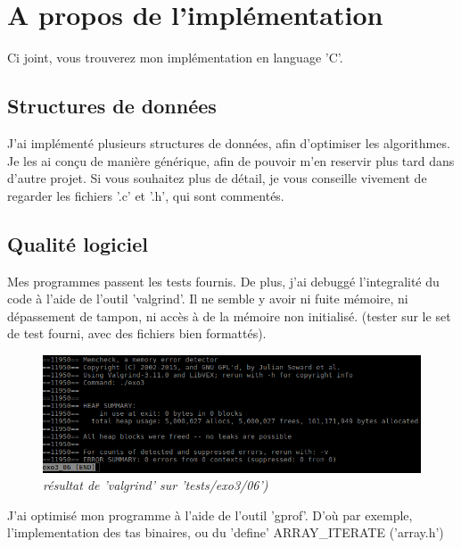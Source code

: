 \documentclass[10pt]{article}
\begin{document}
	\newpage
	\section{A propos de l'implémentation}
		Ci joint, vous trouverez mon implémentation en language 'C'.
		\subsection{Structures de données}
		J'ai implémenté plusieurs structures de données, afin d'optimiser les algorithmes. Je les ai conçu de manière générique,
		afin de pouvoir m'en reservir plus tard dans d'autre projet. Si vous souhaitez plus de détail, je vous
		conseille vivement de regarder les fichiers '.c' et '.h', qui sont commentés.
		
		\subsection{Qualité logiciel}
			Mes programmes passent les tests fournis.\newline    
			De plus, j'ai debuggé l'integralité du code à l'aide de l'outil 'valgrind'.
			Il ne semble y avoir ni fuite mémoire, ni dépassement de tampon, ni accès à de la mémoire non initialisé.
			(tester sur le set de test fourni, avec des fichiers bien formattés).
			\begin{figure}[H]
				\begin{center}
					\includegraphics[width=12cm,height=\textheight,keepaspectratio]{./images/valgrind.png}
				\end{center}
				\caption{\textit{résultat de 'valgrind' sur 'tests/exo3/06')}}
			\end{figure}
			J'ai optimisé mon programme à l'aide de l'outil 'gprof'.
			D'où par exemple, l'implementation des tas binaires, ou du 'define' ARRAY\_ITERATE ('array.h')
	
\end{document}
